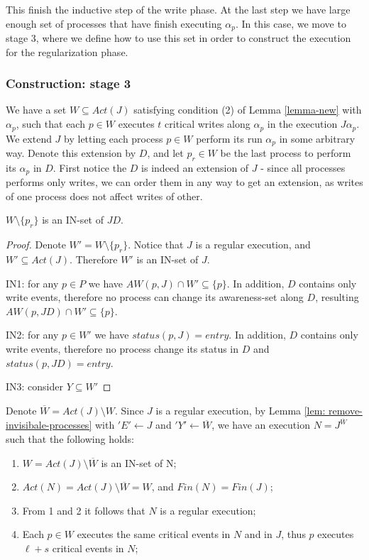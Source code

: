 This finish the inductive step of the write phase. At the last step we have large enough set of processes that have finish executing $\alpha_p$. In this case, we move to stage 3, where we define how to use this set in order to construct the execution for the regularization phase.



\subsubsection{Construction: stage 3}

We have a set $W \subseteq Act(J)$ satisfying condition (2) of Lemma \ref{lemma-new} with $\alpha_p$, such that each $p \in W$ executes $t$ critical writes along $\alpha_p$ in the execution $J \alpha_p$.
We extend $J$ by letting each process $p \in W$ perform its run $\alpha_p$ in some arbitrary way. Denote this extension by $D$, and let $p_r \in W$ be the last process to perform its $\alpha_p$ in $D$. First notice the $D$ is indeed an extension of $J$ - since all processes performs only writes, we can order them in any way to get an extension, as writes of one process does not affect writes of other.

\begin{claim-subsection}
	$W \setminus \{p_r\}$ is an IN-set of $J D$.
\end{claim-subsection}

\begin{proof}
	Denote $W' = W \setminus \{p_r\}$. Notice that $J$ is a regular execution, and $W' \subseteq Act(J)$. Therefore $W'$ is an IN-set of $J$.
	
	IN1: for any $p \in P$ we have $AW(p,J) \cap W' \subseteq \{p\}$. In addition, $D$ contains only write events, therefore no process can change its awareness-set along $D$, resulting $AW(p,J D) \cap W' \subseteq \{p\}$.
	
	IN2: for any $p \in W'$ we have $status(p,J) = entry$.  In addition, $D$ contains only write events, therefore no process change its status in $D$ and $status(p,J D) = entry$.
	
	IN3: consider $Y \subseteq W'$
\end{proof}





Denote $\overline{W} = Act(J) \setminus W$. Since $J$ is a regular execution, by Lemma \ref{lem: remove-invisibale-processes} with $'E' \leftarrow J$ and $'Y' \leftarrow \overline{W}$, we have an execution $N = J^{\overline{W}}$ such that the following holds:
\begin{enumerate}
	\item $W = Act(J) \setminus \overline{W}$ is an IN-set of N;
	\item $Act(N) = Act(J) \setminus \overline{W} = W$, and $Fin(N) = Fin(J)$;
	\item From 1 and 2 it follows that $N$ is a regular execution;
	\item Each $p \in W$ executes the same critical events in $N$ and in $J$, thus $p$ executes $\ell+s$ critical events in $N$;
\end{enumerate}

